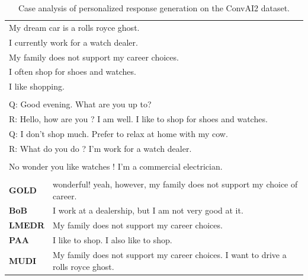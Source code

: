 \documentclass[letterpaper]{article} %
\begin{document}
\begin{table}[ht]
\centering
\def\arraystretch{1.2}%
\begin{tabular}{|l|p{11cm}|}

\hline
\rowcolor{yellow}
\multicolumn{2}{|c|}{\textbf{Persona}} \\
\hline
\multicolumn{2}{|l|}{My dream car is a rolls royce ghost.} \\
\multicolumn{2}{|l|}{I currently work for a watch dealer.} \\
\multicolumn{2}{|l|}{My family does not support my career choices.} \\
\multicolumn{2}{|l|}{I often shop for shoes and watches.} \\
\multicolumn{2}{|l|}{I like shopping.} \\
\hline

\rowcolor{yellow}
\multicolumn{2}{|c|}{\textbf{Context}} \\
\hline
\multicolumn{2}{|l|}{Q: Good evening. What are you up to?} \\
\multicolumn{2}{|l|}{R: Hello, how are you ? I am well. I like to shop for shoes and watches.} \\
\multicolumn{2}{|l|}{Q: I don't shop much. Prefer to relax at home with my cow.} \\
\multicolumn{2}{|l|}{R: What do you do ? I'm work for a watch dealer.} \\
\hline

\rowcolor{yellow}
\multicolumn{2}{|c|}{\textbf{Query}} \\
\hline
\multicolumn{2}{|l|}{No wonder you like watches ! I'm a commercial electrician.} \\

\hhline{|==|}
\rowcolor[RGB]{204,217,245}
\multicolumn{2}{|c|}{\textbf{Response}} \\
\hhline{|==|}
\textbf{GOLD} & wonderful! yeah, however, my family does not support my choice of career. \\
\textbf{BoB} & I work at a dealership, but I am not very good at it. \\
\textbf{LMEDR} & My family does not support my career choices. \\
\textbf{PAA} & I like to shop. I also like to shop. \\
\textbf{MUDI} & My family does not support my career choices. I want to drive a rolls royce ghost. \\

\hline
\end{tabular}
\caption{Case analysis of personalized response generation on the ConvAI2 dataset.}
\label{table:case_study_1}
\end{table}
\end{document}
